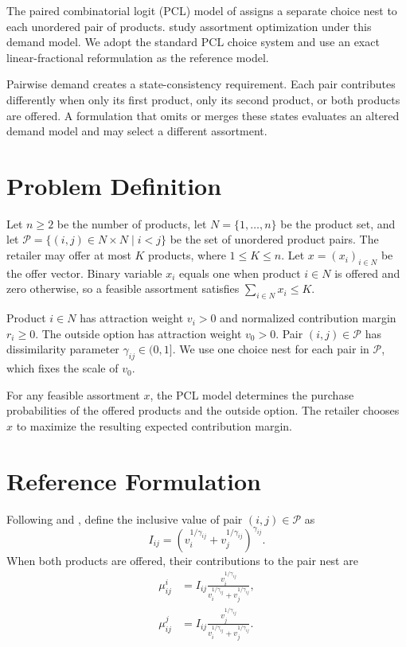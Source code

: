 \documentclass[10pt]{article}
\begin{document}
The paired combinatorial logit (PCL) model of \citet{koppelman2000} assigns a separate choice nest to each unordered pair of products. \citet{zhang2020} study assortment optimization under this demand model. We adopt the standard PCL choice system and use an exact linear-fractional reformulation as the reference model.

Pairwise demand creates a state-consistency requirement. Each pair contributes differently when only its first product, only its second product, or both products are offered. A formulation that omits or merges these states evaluates an altered demand model and may select a different assortment.

\section{Problem Definition}

Let $n\ge2$ be the number of products, let $N=\{1,\ldots,n\}$ be the product set, and let $\mathcal P=\{(i,j)\in N\times N\mid i<j\}$ be the set of unordered product pairs. The retailer may offer at most $K$ products, where $1\le K\le n$. Let $x=(x_i)_{i\in N}$ be the offer vector. Binary variable $x_i$ equals one when product $i\in N$ is offered and zero otherwise, so a feasible assortment satisfies $\sum_{i\in N}x_i\le K$.

Product $i\in N$ has attraction weight $v_i>0$ and normalized contribution margin $r_i\ge0$. The outside option has attraction weight $v_0>0$. Pair $(i,j)\in\mathcal P$ has dissimilarity parameter $\gamma_{ij}\in(0,1]$. We use one choice nest for each pair in $\mathcal P$, which fixes the scale of $v_0$.

For any feasible assortment $x$, the PCL model determines the purchase probabilities of the offered products and the outside option. The retailer chooses $x$ to maximize the resulting expected contribution margin.

\section{Reference Formulation}

Following \citet{koppelman2000} and \citet{zhang2020}, define the inclusive value of pair $(i,j)\in\mathcal P$ as
\begin{equation}
I_{ij}
=
\left(
v_i^{1/\gamma_{ij}}+v_j^{1/\gamma_{ij}}
\right)^{\gamma_{ij}}.
\label{eq:nest}
\end{equation}
When both products are offered, their contributions to the pair nest are
\begin{align}
\mu_{ij}^i
&=
I_{ij}
\frac{v_i^{1/\gamma_{ij}}}
{v_i^{1/\gamma_{ij}}+v_j^{1/\gamma_{ij}}},
\label{eq:massI}\\
\mu_{ij}^j
&=
I_{ij}
\frac{v_j^{1/\gamma_{ij}}}
{v_i^{1/\gamma_{ij}}+v_j^{1/\gamma_{ij}}}.
\label{eq:massJ}
\end{align}
\end{document}
